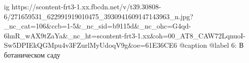  
 
 
 
 

\ifcmt
  ig https://scontent-frt3-1.xx.fbcdn.net/v/t39.30808-6/271659531_622991919010475_3930941609147143963_n.jpg?_nc_cat=106&ccb=1-5&_nc_sid=b9115d&_nc_ohc=G4qd-6hnR_wAX9tZaYa&_nc_ht=scontent-frt3-1.xx&oh=00_AT8_CAW72LqnuoI-Sw5DPIEkQGMpu4v3FZurlMyUdoqV9g&oe=61E36CE6
  @caption @label 6: В ботаническом саду
\fi
